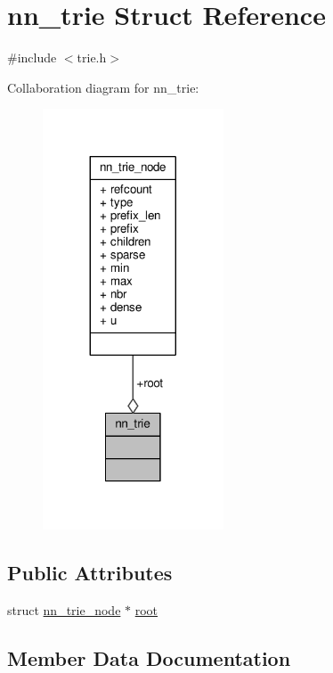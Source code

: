 \hypertarget{structnn__trie}{}\section{nn\+\_\+trie Struct Reference}
\label{structnn__trie}


{\ttfamily \#include $<$trie.\+h$>$}



Collaboration diagram for nn\+\_\+trie\+:\nopagebreak
\begin{figure}[H]
\begin{center}
\leavevmode
\includegraphics[width=152pt]{structnn__trie__coll__graph}
\end{center}
\end{figure}
\subsection*{Public Attributes}
\begin{DoxyCompactItemize}
\item 
struct \hyperlink{structnn__trie__node}{nn\+\_\+trie\+\_\+node} $\ast$ \hyperlink{structnn__trie_a013f0fc99bb590967abc42b70fc02b40}{root}
\end{DoxyCompactItemize}


\subsection{Member Data Documentation}
